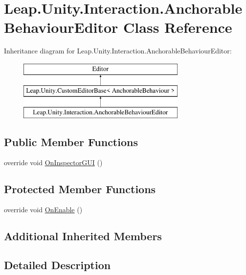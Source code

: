 \hypertarget{class_leap_1_1_unity_1_1_interaction_1_1_anchorable_behaviour_editor}{}\section{Leap.\+Unity.\+Interaction.\+Anchorable\+Behaviour\+Editor Class Reference}
\label{class_leap_1_1_unity_1_1_interaction_1_1_anchorable_behaviour_editor}
Inheritance diagram for Leap.\+Unity.\+Interaction.\+Anchorable\+Behaviour\+Editor\+:\begin{figure}[H]
\begin{center}
\leavevmode
\includegraphics[height=3.000000cm]{class_leap_1_1_unity_1_1_interaction_1_1_anchorable_behaviour_editor}
\end{center}
\end{figure}
\subsection*{Public Member Functions}
\begin{DoxyCompactItemize}
\item 
override void \mbox{\hyperlink{class_leap_1_1_unity_1_1_interaction_1_1_anchorable_behaviour_editor_a7ec140adf78746ff5657caa47f3b79b9}{On\+Inspector\+G\+UI}} ()
\end{DoxyCompactItemize}
\subsection*{Protected Member Functions}
\begin{DoxyCompactItemize}
\item 
override void \mbox{\hyperlink{class_leap_1_1_unity_1_1_interaction_1_1_anchorable_behaviour_editor_a6e5c7f06d6840902fde3326ad0ecb0a0}{On\+Enable}} ()
\end{DoxyCompactItemize}
\subsection*{Additional Inherited Members}


\subsection{Detailed Description}


